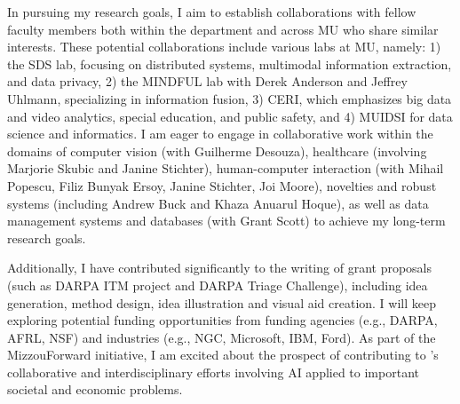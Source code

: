 \documentclass[11pt]{article}
\begin{document}
%
In pursuing my research goals, I aim to establish collaborations with fellow faculty members both within the department and across MU who share similar interests. These potential collaborations include various labs at MU, namely:
1) the SDS lab, focusing on distributed systems, multimodal information extraction, and data privacy,
2) the MINDFUL lab with Derek Anderson and Jeffrey Uhlmann, specializing in information fusion,
3) CERI, which emphasizes big data and video analytics, special education, and public safety, and
4) MUIDSI for data science and informatics.
I am eager to engage in collaborative work within the domains of computer vision (with Guilherme Desouza), healthcare (involving Marjorie Skubic and Janine Stichter), human-computer interaction (with Mihail Popescu, Filiz Bunyak Ersoy, Janine Stichter, Joi Moore), novelties and robust systems (including Andrew Buck and Khaza Anuarul Hoque), as well as data management systems and databases (with Grant Scott)
to achieve my long-term research goals.


Additionally, I have contributed significantly to the writing of grant proposals (such as DARPA ITM project and DARPA Triage Challenge), including idea generation, method design, idea illustration and visual aid creation. I will keep exploring potential funding opportunities from funding agencies (e.g., DARPA, AFRL, NSF)
and industries (e.g., NGC, Microsoft, IBM, Ford).
As part of the MizzouForward initiative, I am excited about the prospect of contributing to \shortInstitutionName{}'s collaborative and interdisciplinary efforts involving AI applied to important societal and economic problems.

\end{document}
